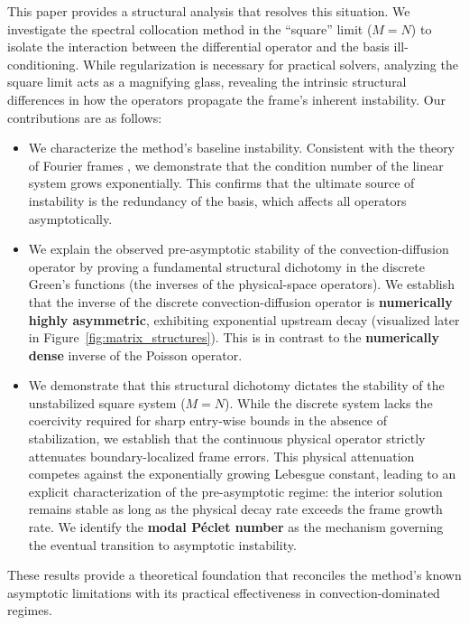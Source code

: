\documentclass[pdflatex,sn-mathphys-num]{sn-jnl}%
\theoremstyle{thmstyleone}%
\begin{document}
This paper provides a structural analysis that resolves this situation. We investigate the spectral collocation method in the ``square'' limit ($M=N$) to isolate the interaction between the differential operator and the basis ill-conditioning. While regularization is necessary for practical solvers, analyzing the square limit acts as a magnifying glass, revealing the intrinsic structural differences in how the operators propagate the frame's inherent instability. Our contributions are as follows:
\begin{itemize}
    \item We characterize the method's baseline instability. Consistent with the theory of Fourier frames \cite{adcock2014numerical, platte2011impossibility}, we demonstrate that the condition number of the linear system grows exponentially. This confirms that the ultimate source of instability is the redundancy of the basis, which affects all operators asymptotically.
    
    \item We explain the observed pre-asymptotic stability of the convection-diffusion operator by proving a fundamental structural dichotomy in the discrete Green's functions (the inverses of the physical-space operators). We establish that the inverse of the discrete convection-diffusion operator is \textbf{numerically highly asymmetric}, exhibiting exponential upstream decay (visualized later in Figure~\ref{fig:matrix_structures}). This is in contrast to the \textbf{numerically dense} inverse of the Poisson operator.
    
    \item We demonstrate that this structural dichotomy dictates the stability of the unstabilized square system ($M=N$). While the discrete system lacks the coercivity required for sharp entry-wise bounds in the absence of stabilization, we establish that the continuous physical operator strictly attenuates boundary-localized frame errors. This physical attenuation competes against the exponentially growing Lebesgue constant, leading to an explicit characterization of the pre-asymptotic regime: the interior solution remains stable as long as the physical decay rate exceeds the frame growth rate. We identify the \textbf{modal P\'eclet number} as the mechanism governing the eventual transition to asymptotic instability.
\end{itemize}

These results provide a theoretical foundation that reconciles the method's known asymptotic limitations with its practical effectiveness in convection-dominated regimes.
\end{document}
